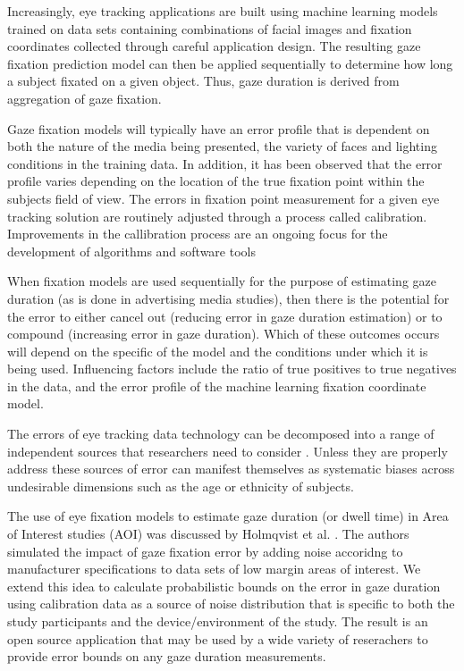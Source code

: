 \documentclass[12pt,a4paper]{article}
\numberwithin{equation}{section}
\begin{document}
Increasingly, eye tracking applications are built using machine learning models trained on 
data sets containing combinations of facial images and fixation coordinates collected 
through careful application design. The resulting gaze fixation prediction model can 
then be applied sequentially to determine how long a subject fixated on a given object.
Thus, gaze duration is derived from aggregation of gaze fixation.

Gaze fixation models will typically have an error profile that is dependent on both 
the nature of the media being presented, the variety of faces and lighting conditions 
in the training data. In addition, it has been observed that the error profile varies 
depending on the location of the true fixation point within the subjects field of view.
The errors in fixation point measurement for a given eye tracking solution are routinely
adjusted through a process called calibration. Improvements in the callibration process
are an ongoing focus for the development of algorithms\cite{Zhang2014,Hassoumi2019} 
and software tools\cite{ETCAL2018} 

When fixation models are used sequentially for the purpose of estimating gaze duration
(as is done in advertising media studies), then there is the potential for the error
to either cancel out (reducing error in gaze duration estimation) or to compound
(increasing error in gaze duration). Which of these outcomes occurs will depend on the
specific of the model and the conditions under which it is being used.
Influencing factors include the ratio of true positives to true negatives in the data,
and the error profile of the machine learning fixation coordinate model.

The errors of eye tracking data technology can be decomposed into a range of
independent sources that researchers need to consider \cite{Holmqvist2012}.
Unless they are properly address these sources of error can manifest themselves
as systematic biases across undesirable dimensions such as the age\cite{Dalrymple2018}
or ethnicity of subjects\cite{Blignaut2013}. 

The use of eye fixation models to estimate gaze duration (or dwell time) in Area of
Interest studies (AOI) was discussed by Holmqvist et al. \cite{Holmqvist2012}. The
authors simulated the impact of gaze fixation error by adding noise accoridng to
manufacturer specifications to data sets of low margin areas of interest. We extend 
this idea to calculate probabilistic bounds on the error in gaze duration using
calibration data as a source of noise distribution that is specific to both the
study participants and the device/environment of the study. The result is an open
source application that may be used by a wide variety of reserachers to provide
error bounds on any gaze duration measurements.
\end{document}
